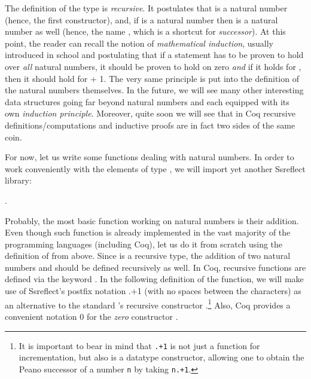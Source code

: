 The definition of the type  is \textit{recursive}.  It postulates that
 is a natural number (hence, the first constructor), and, if  is
a natural number then   is a natural number as well (hence, the
name , which is a shortcut for \textit{successor}). At this point, the
reader can recall the notion of \textit{mathematical induction}, usually
introduced in school and postulating that if a statement  has to be
proven to hold over \textit{all} natural numbers, it should be proven to hold
on zero \textit{and} if it holds for , then it should hold for  +
1. The very same principle is put into the definition of the natural
numbers themselves. In the future, we will see many other interesting
data structures going far beyond natural numbers and each equipped
with its own \textit{induction principle}.  Moreover, quite soon we will see
that in Coq recursive definitions/computations and inductive proofs
are in fact two sides of the same coin.


For now, let us write some functions dealing with natural numbers.  In
order to work conveniently with the elements of type , we will
import yet another Ssreflect library:




\begin{coqdoccode}
\coqdocemptyline
\coqdocnoindent
{} \coqdoceol
\coqdocnoindent
{}  .\coqdoceol
\coqdocemptyline
\end{coqdoccode}


Probably, the most basic function working on natural numbers is their
addition. Even though such function is already implemented in the vast
majority of the programming languages (including Coq), let us do it
from scratch using the definition of  from above. Since  is
a recursive type, the addition of two natural numbers  and 
should be defined recursively as well. In Coq, recursive functions are
defined via the keyword . In the following definition of the
 function, we will make use of Ssreflect's postfix notation
.+1 (with no spaces between the characters) as an alternative to the
standard 's recursive constructor .\footnote{It is important
to bear in mind that \texttt{.+1} is not just a function for
incrementation, but also is a datatype constructor, allowing one to
obtain the Peano successor of a number \texttt{n} by taking
\texttt{n.+1}.} Also, Coq provides a convenient notation 0 for the
\textit{zero} constructor .


